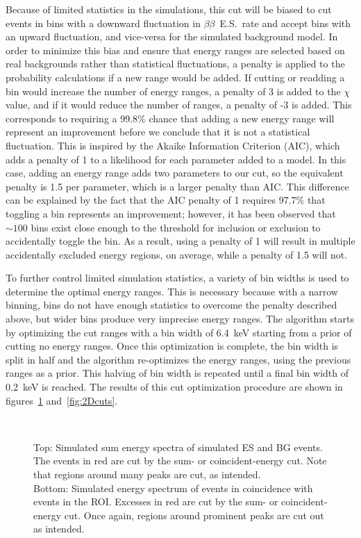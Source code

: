 \documentclass[notitlepage,rmp,aps,10pt]{revtex4-1}
\newcommand{\bb}{${\beta \beta}$}
\newcommand{\bbes}{\bb~E.S.}
\begin{document}
Because of limited statistics in the simulations, this cut will be biased to cut events in bins with a downward fluctuation in \bbes\ rate and accept bins with an upward fluctuation, and vice-versa for the simulated background model.
In order to minimize this bias and ensure that energy ranges are selected based on real backgrounds rather than statistical fluctuations, a penalty is applied to the probability calculations if a new range would be added.
If cutting or readding a bin would increase the number of energy ranges, a penalty of 3 is added to the $\chi$ value, and if it would reduce the number of ranges, a penalty of -3 is added.
This corresponds to requiring a 99.8\% chance that adding a new energy range will represent an improvement before we conclude that it is not a statistical fluctuation.
This is inspired by the Akaike Information Criterion (AIC)\cite{Akaike1974}, which adds a penalty of 1 to a likelihood for each parameter added to a model.
In this case, adding an energy range adds two parameters to our cut, so the equivalent penalty is 1.5 per parameter, which is a larger penalty than AIC.
This difference can be explained by the fact that the AIC penalty of 1 requires 97.7\% that toggling a bin represents an improvement; however, it has been observed that ${\sim}100$ bins exist close enough to the threshold for inclusion or exclusion to accidentally toggle the bin.
As a result, using a penalty of 1 will result in multiple accidentally excluded energy regions, on average, while a penalty of 1.5 will not.

To further control limited simulation statistics, a variety of bin widths is used to determine the optimal energy ranges.
This is necessary because with a narrow binning, bins do not have enough statistics to overcome the penalty described above, but wider bins produce very imprecise energy ranges.
The algorithm starts by optimizing the cut ranges with a bin width of 6.4~keV starting from a prior of cutting no energy ranges.
Once this optimization is complete, the bin width is split in half and the algorithm re-optimizes the energy ranges, using the previous ranges as a prior.
This halving of bin width is repeated until a final bin width of 0.2~keV is reached.
The results of this cut optimization procedure are shown in figures~\ref{fig:sumandcoinEcuts} and~\ref{fig:2Dcuts}.

\begin{figure}[!t]
  \centering
  \\
  \caption{\label{fig:sumandcoinEcuts}
    Top: Simulated sum energy spectra of simulated ES and BG events. The events in red are cut by the sum- or coincident-energy cut. Note that regions around many peaks are cut, as intended.\\
    Bottom: Simulated energy spectrum of events in coincidence with events in the ROI. Excesses in red are cut by the sum- or coincident-energy cut. Once again, regions around prominent peaks are cut out as intended.
  }
\end{figure}
\end{document}
